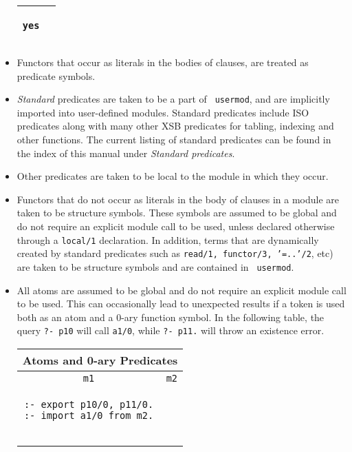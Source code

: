 \begin{itemize}
\begin{center}
\begin{tabular}{cc}
\begin{minipage}{14.5em}
\begin{verbatim}
yes
\end{verbatim}
\end{minipage}
\\ \hline \hline
\end{tabular}
\end{center}
%
\item Functors that occur as literals in the bodies of clauses, are
  treated as predicate symbols.  
\bi
\item {\em Standard} predicates are taken to be a part of {\tt
  usermod}, and are implicitly imported into user-defined modules.
  Standard predicates include ISO predicates along with many other XSB
  predicates for tabling, indexing and other functions.  The current
  listing of standard predicates can be found in the index of this
  manual under {\em Standard predicates}.
%
\item Other predicates are taken to be local to the module in which
  they occur.
\ei
\item Functors that do not occur as literals in the body of clauses in
  a module are taken to be structure symbols.  These symbols are
  assumed to be global and do not require an explicit module call to
  be used, unless declared otherwise through a {\tt local/1}
  declaration.  In addition, terms that are dynamically created by
  standard predicates such as {\tt read/1, functor/3, '=..'/2}, etc)
  are taken to be structure symbols and are contained in {\tt
    usermod}.  
%
%
\item All atoms are assumed to be global and do not require an
  explicit module call to be used.  This can occasionally lead to
  unexpected results if a token is used both as an atom and a 0-ary
  function symbol.  In the following table, the query {\tt ?- p10}
  will call {\tt a1/0}, while {\tt ?- p11.} will throw an existence
  error.

\begin{center}
\begin{tabular}{cc}\hline \hline
\multicolumn{2}{c}{\rule{0ex}{2.5ex}\textbf{Atoms and 0-ary Predicates}} \\ \hline \hline
\rule[-2ex]{0ex}{5ex} \texttt{m1} & \texttt{m2} \\
\begin{minipage}{18.5em}
\begin{verbatim}
:- export p10/0, p11/0.
:- import a1/0 from m2.


\end{verbatim}
\end{minipage}
\end{tabular}
\end{center}
\end{itemize}
